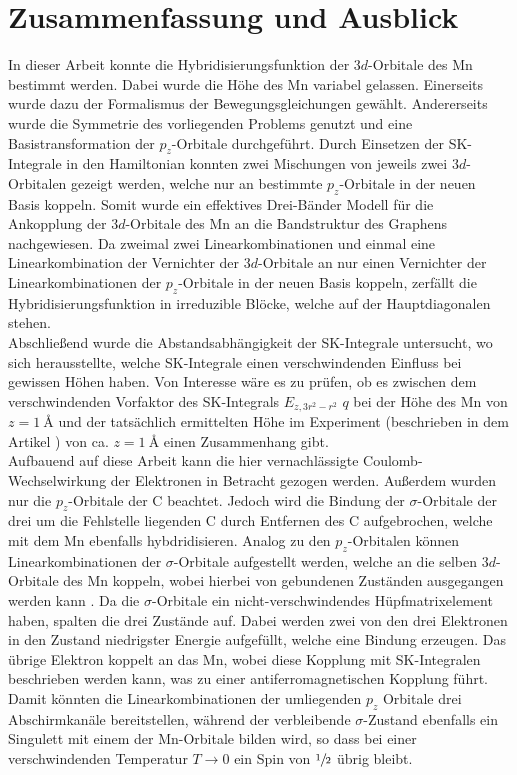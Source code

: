 \chapter{Zusammenfassung und Ausblick}
\label{chap:Zusammenfassung_und_Ausblick}
In dieser Arbeit konnte die Hybridisierungsfunktion der $3d$-Orbitale des Mn bestimmt werden.
Dabei wurde die Höhe des Mn variabel gelassen.
Einerseits wurde dazu der Formalismus der Bewegungsgleichungen gewählt.
Andererseits wurde die Symmetrie des vorliegenden Problems genutzt und eine Basistransformation der $p_z$-Orbitale durchgeführt. 
Durch Einsetzen der SK-Integrale in den Hamiltonian konnten zwei Mischungen von jeweils zwei $3d$-Orbitalen gezeigt werden, welche nur 
an bestimmte $p_z$-Orbitale in der neuen Basis koppeln.
Somit wurde ein effektives Drei-Bänder Modell für die Ankopplung der $3d$-Orbitale des Mn an die Bandstruktur des Graphens nachgewiesen.
Da zweimal zwei Linearkombinationen und einmal eine Linearkombination der Vernichter der $3d$-Orbitale an nur einen Vernichter der Linearkombinationen
der $p_z$-Orbitale in der neuen Basis koppeln, zerfällt die Hybridisierungsfunktion in irreduzible Blöcke, welche auf der Hauptdiagonalen stehen. \\
Abschließend wurde die Abstandsabhängigkeit der SK-Integrale untersucht, wo sich herausstellte, welche SK-Integrale 
einen verschwindenden Einfluss bei gewissen Höhen haben.
Von Interesse wäre es zu prüfen, ob es zwischen dem verschwindenden Vorfaktor des SK-Integrals $E_{z,3r^2-r^2}$ $q$ bei der Höhe 
des Mn von $z=\qty{1}{\angstrom}$ und der tatsächlich ermittelten Höhe im Experiment (beschrieben in dem 
Artikel \cite{doi:10.1021/acsnano.1c00139}) von ca. $z=\qty{1}{\angstrom}$ einen Zusammenhang gibt.\\
Aufbauend auf diese Arbeit kann die hier vernachlässigte Coulomb-Wechselwirkung der Elektronen in Betracht gezogen werden.
Außerdem wurden nur die $p_z$-Orbitale der C beachtet.
Jedoch wird die Bindung der $\sigma$-Orbitale der drei um die Fehlstelle liegenden C durch Entfernen des C
aufgebrochen, welche mit dem Mn ebenfalls hybdridisieren.
Analog zu den $p_z$-Orbitalen können Linearkombinationen der $\sigma$-Orbitale aufgestellt werden, welche an die selben 
$3d$-Orbitale des Mn koppeln, wobei hierbei von gebundenen Zuständen ausgegangen werden kann \cite{PhysRevB.97.155419}.
Da die $\sigma$-Orbitale ein nicht-verschwindendes Hüpfmatrixelement haben, spalten die drei Zustände auf.
Dabei werden zwei von den drei Elektronen in den Zustand niedrigster Energie aufgefüllt, welche eine Bindung erzeugen. 
Das übrige Elektron koppelt an das Mn, wobei diese Kopplung mit SK-Integralen beschrieben werden kann, was 
zu einer antiferromagnetischen Kopplung führt.
Damit könnten die Linearkombinationen der umliegenden $p_z$ Orbitale drei Abschirmkanäle bereitstellen, während der verbleibende $\sigma$-Zustand
ebenfalls ein Singulett mit einem der Mn-Orbitale bilden wird, so dass bei einer verschwindenden Temperatur $T \to 0$ ein Spin von 
$\sfrac{1}{2}$ übrig bleibt.